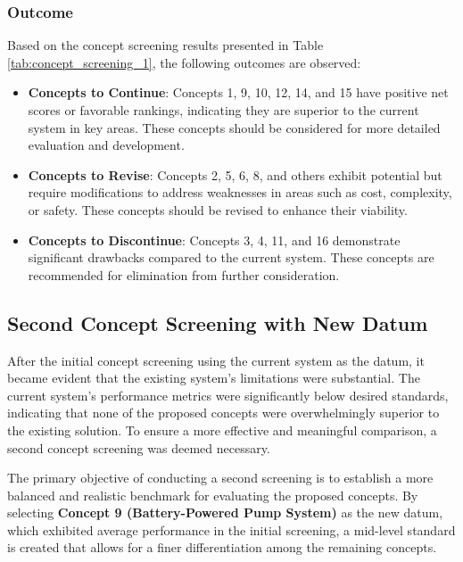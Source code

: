 \documentclass[12pt]{report}
\begin{document}
\subsubsection{Outcome}
\label{subsubsec:concept_screening_outcome}

Based on the concept screening results presented in Table \ref{tab:concept_screening_1}, the following outcomes are observed:

\begin{itemize}
    \item \textbf{Concepts to Continue}: Concepts 1, 9, 10, 12, 14, and 15 have positive net scores or favorable rankings, indicating they are superior to the current system in key areas. These concepts should be considered for more detailed evaluation and development.
    
    \item \textbf{Concepts to Revise}: Concepts 2, 5, 6, 8, and others exhibit potential but require modifications to address weaknesses in areas such as cost, complexity, or safety. These concepts should be revised to enhance their viability.
    
    \item \textbf{Concepts to Discontinue}: Concepts 3, 4, 11, and 16 demonstrate significant drawbacks compared to the current system. These concepts are recommended for elimination from further consideration.
\end{itemize}

\subsection{Second Concept Screening with New Datum}
\label{subsec:second_concept_screening}


After the initial concept screening using the current system as the datum, it became evident that the existing system's limitations were substantial. The current system's performance metrics were significantly below desired standards, indicating that none of the proposed concepts were overwhelmingly superior to the existing solution. To ensure a more effective and meaningful comparison, a second concept screening was deemed necessary.


The primary objective of conducting a second screening is to establish a more balanced and realistic benchmark for evaluating the proposed concepts. By selecting \textbf{Concept 9 (Battery-Powered Pump System)} as the new datum, which exhibited average performance in the initial screening, a mid-level standard is created that allows for a finer differentiation among the remaining concepts. 
\end{document}

